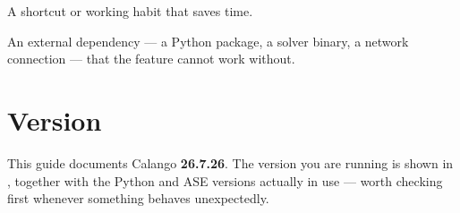 \begin{caltip}
A shortcut or working habit that saves time.
\end{caltip}

\begin{calwarn}
An external dependency --- a Python package, a solver binary, a network
connection --- that the feature cannot work without.
\end{calwarn}

\section*{Version}

This guide documents Calango \textbf{26.7.26}. The version you are running
is shown in \menusep{}, together with the
Python and ASE versions actually in use --- worth checking first whenever
something behaves unexpectedly.
